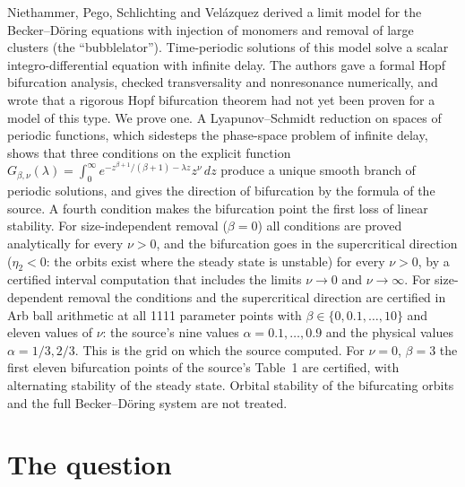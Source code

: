 \documentclass[11pt,a4paper]{report}
\begin{document}
\makepapertitle

\begin{paperabstract}
Niethammer, Pego, Schlichting and Velázquez derived a limit model for the Becker--Döring equations with injection of monomers and removal of large clusters (the ``bubblelator''). Time-periodic solutions of this model solve a scalar integro-differential equation with infinite delay. The authors gave a formal Hopf bifurcation analysis, checked transversality and nonresonance numerically, and wrote that a rigorous Hopf bifurcation theorem had not yet been proven for a model of this type. We prove one. A Lyapunov--Schmidt reduction on spaces of periodic functions, which sidesteps the phase-space problem of infinite delay, shows that three conditions on the explicit function $G_{\beta,\nu}(\lambda)=\int_0^\infty e^{-z^{\beta+1}/(\beta+1)-\lambda z}z^\nu\,dz$ produce a unique smooth branch of periodic solutions, and gives the direction of bifurcation by the formula of the source. A fourth condition makes the bifurcation point the first loss of linear stability. For size-independent removal ($\beta=0$) all conditions are proved analytically for every $\nu>0$, and the bifurcation goes in the supercritical direction ($\eta_2<0$: the orbits exist where the steady state is unstable) for every $\nu>0$, by a certified interval computation that includes the limits $\nu\to0$ and $\nu\to\infty$. For size-dependent removal the conditions and the supercritical direction are certified in Arb ball arithmetic at all 1111 parameter points with $\beta\in\{0,0.1,\dots,10\}$ and eleven values of $\nu$: the source's nine values $\alpha=0.1,\dots,0.9$ and the physical values $\alpha=1/3,2/3$. This is the grid on which the source computed. For $\nu=0$, $\beta=3$ the first eleven bifurcation points of the source's Table~1 are certified, with alternating stability of the steady state. Orbital stability of the bifurcating orbits and the full Becker--Döring system are not treated.
\end{paperabstract}

\section{The question}\label{sec:question}
\end{document}
